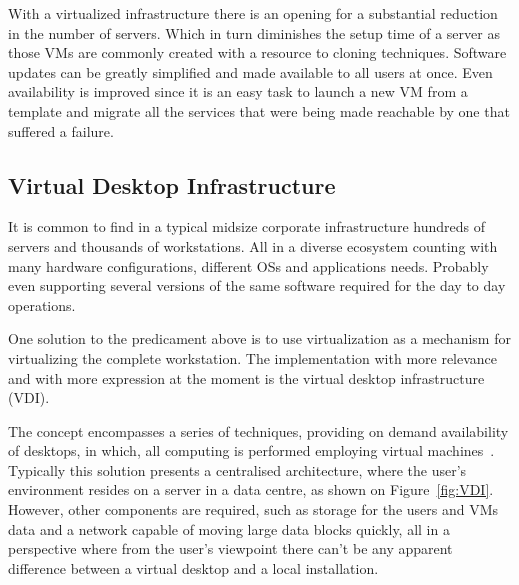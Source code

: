 With a virtualized infrastructure there is an opening for a substantial reduction in the number of servers. Which in turn diminishes the setup time of a server as those VMs are commonly created with a resource to cloning techniques. Software updates can be greatly simplified and made available to all users at once. Even availability is improved since it is an easy task to launch a new VM from a template and migrate all the services that were being made reachable by one that suffered a failure. 




\subsection{Virtual Desktop Infrastructure} %
\label{sub:vdi}


It is common to find in a typical midsize corporate infrastructure hundreds of servers and thousands of workstations. All in a diverse ecosystem counting with many hardware configurations, different OSs and applications needs. Probably even supporting several versions of the same software required for the day to day operations.

One solution to the predicament above is to use virtualization as a mechanism for virtualizing the complete workstation. The implementation with more relevance and with more expression at the moment is the virtual desktop infrastructure (VDI).

The concept encompasses a series of techniques, providing on demand availability of desktops, in which, all computing is performed employing virtual machines~\cite{VMWare_VDI2006}.
Typically this solution presents a centralised architecture, where the user's environment resides on a server in a data centre, as shown on Figure~\ref{fig:VDI}. However, other components are required, such as storage for the users and VMs data and a network capable of moving large data blocks quickly, all in a perspective where from the user's viewpoint there can't be any apparent difference between a virtual desktop and a local installation.


